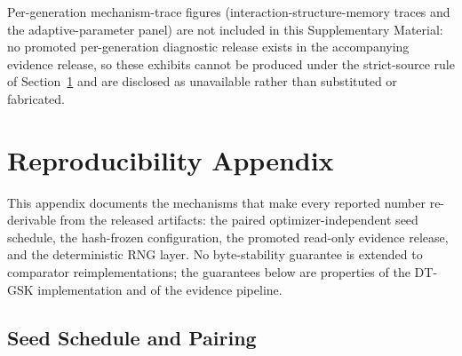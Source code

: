 \documentclass[algorithms,article,submit,moreauthors,pdftex]{Definitions/mdpi}
\newcommand{\dtgsk}{DT-GSK}
\begin{document}
Per-generation mechanism-trace figures (interaction-structure-memory
traces and the adaptive-parameter panel) are not included in this
Supplementary Material: no promoted per-generation diagnostic release
exists in the accompanying evidence release, so these
exhibits cannot be produced under the strict-source rule of
Section~\ref{sec:repro} and are disclosed as unavailable rather than
substituted or fabricated.

\section{Reproducibility Appendix}\label{sec:repro}

This appendix documents the mechanisms that make every reported number
re-derivable from the released artifacts: the paired
optimizer-independent seed schedule, the hash-frozen configuration, the
promoted read-only evidence release, and the deterministic RNG layer.
No byte-stability guarantee is extended to comparator
reimplementations; the guarantees below are properties of the \dtgsk{}
implementation and of the evidence pipeline.

\subsection{Seed Schedule and Pairing}\label{sec:repro:seeds}
\end{document}
